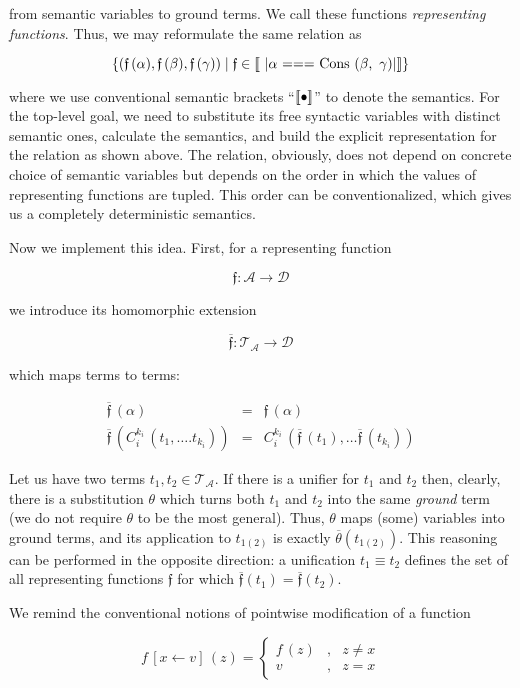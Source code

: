 from semantic variables to ground terms. We call these functions \emph{representing functions}. Thus, we may reformulate the same relation as

\[
\{(\mathfrak{f}\,(\alpha),\mathfrak{f}\,(\beta),\mathfrak{f}\,(\gamma))\mid\mathfrak{f}\in\sembr{\mbox{\lstinline|$\alpha$ === Cons ($\beta$, $\,\gamma$)|}}\}
\]

where we use conventional semantic brackets ``$\llbracket{\bullet}\rrbracket$'' to denote the semantics. For the top-level goal, we need to substitute its free syntactic
variables with distinct semantic ones, calculate the semantics, and build the explicit representation for the relation as shown above. The relation, obviously,
does not depend on concrete choice of semantic variables but depends on the order in which the values of representing functions are tupled. This order can be
conventionalized, which gives us a completely deterministic semantics.

Now we implement this idea. First, for a representing function

\[
\mathfrak{f} : \mathcal{A}\to\mathcal{D}
\]

we introduce its homomorphic extension 

\[
  \overline{\mathfrak{f}}:\mathcal{T_A}\to\mathcal{D}
\]

which maps terms to terms:

\[
\begin{array}{rcl}
  \overline{\mathfrak f}\,(\alpha) & = & \mathfrak f\,(\alpha)\\
  \overline{\mathfrak f}\,(C_i^{k_i}\,(t_1,\dots.t_{k_i})) & = & C_i^{k_i}\,(\overline{\mathfrak f}\,(t_1),\dots \overline{\mathfrak f}\,(t_{k_i}))
\end{array}
\]

Let us have two terms $t_1, t_2\in\mathcal{T_A}$. If there is a unifier for $t_1$ and $t_2$ then, clearly, there is a substitution $\theta$ which
turns both $t_1$ and $t_2$ into the same \emph{ground} term (we do not require $\theta$ to be the most general). Thus, $\theta$ maps
(some) variables into ground terms, and its application to $t_{1(2)}$ is exactly $\overline{\theta}(t_{1(2)})$. This reasoning can be
performed in the opposite direction: a unification $t_1\equiv t_2$ defines the set of all representing functions $\mathfrak{f}$ for which
$\overline{\mathfrak{f}}(t_1)=\overline{\mathfrak{f}}(t_2)$. 

We remind the conventional notions of pointwise modification of a function

\[
f\,[x\gets v]\,(z)=\left\{
\begin{array}{rcl}
  f\,(z) &,& z \ne x \\
  v      &,& z = x
\end{array}
\right.
\]

